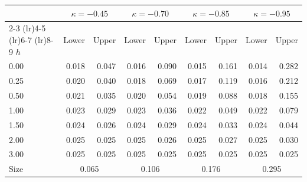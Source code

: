 \begin{tabular}{lrrrrrrrr}
\toprule
 & \multicolumn{2}{c}{$\kappa = -0.45$} & \multicolumn{2}{c}{$\kappa = -0.70$} & \multicolumn{2}{c}{$\kappa = -0.85$} & \multicolumn{2}{c}{$\kappa = -0.95$} \\
\cmidrule(lr){2-3} \cmidrule(lr){4-5} \cmidrule(lr){6-7} \cmidrule(lr){8-9}
$h$ & Lower & Upper & Lower & Upper & Lower & Upper & Lower & Upper \\
\midrule
0.00 & 0.018 & 0.047 & 0.016 & 0.090 & 0.015 & 0.161 & 0.014 & 0.282 \\
0.25 & 0.020 & 0.040 & 0.018 & 0.069 & 0.017 & 0.119 & 0.016 & 0.212 \\
0.50 & 0.021 & 0.035 & 0.020 & 0.054 & 0.019 & 0.088 & 0.018 & 0.155 \\
1.00 & 0.023 & 0.029 & 0.023 & 0.036 & 0.022 & 0.049 & 0.022 & 0.079 \\
1.50 & 0.024 & 0.026 & 0.024 & 0.029 & 0.024 & 0.033 & 0.024 & 0.044 \\
2.00 & 0.025 & 0.025 & 0.025 & 0.026 & 0.025 & 0.027 & 0.025 & 0.030 \\
3.00 & 0.025 & 0.025 & 0.025 & 0.025 & 0.025 & 0.025 & 0.025 & 0.025 \\
\midrule
Size & \multicolumn{2}{c}{0.065} & \multicolumn{2}{c}{0.106} & \multicolumn{2}{c}{0.176} & \multicolumn{2}{c}{0.295} \\
\bottomrule
\end{tabular}
